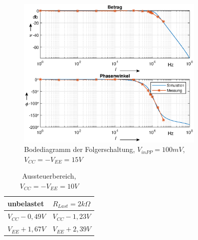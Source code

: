 \begin{figure}[H]
    \centering
    \includegraphics[width=0.8\textwidth]{Lab_1/Plots/Folger.eps}
    \caption{Bodediagramm der Folgerschaltung, $V_{inPP}=100mV$, $V_{CC}=-V_{EE}=15V$}
    \label{fig:Bode_Folger_ua741}
\end{figure}

\begin{table}[H]
\centering
\caption{Aussteuerbereich,  $V_{CC}=-V_{EE}=10V$}
\label{tab:Clip_Folger_ua741}
\begin{tabular}{|l|l|}
\hline
unbelastet       & $R_{Last} = 2k\Omega$ \\ \hline
$V_{CC} - 0,49V$ & $V_{CC} - 1,23V$      \\ \hline
$V_{EE} + 1,67V$ & $V_{EE} + 2,39V$      \\ \hline
\end{tabular}
\end{table}

